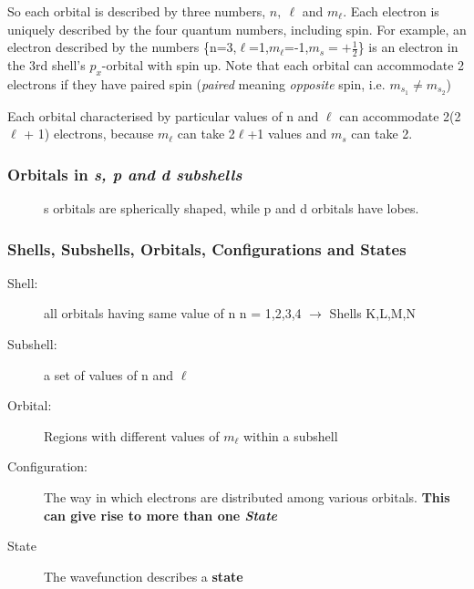 \documentclass[a4paper,titlepage]{article}
\begin{document}
\begin{frame}
So each orbital is described by three numbers, \(n,\ \ell\) and \(m_\ell\).
\bigskip
Each electron is uniquely described by the four quantum numbers, including spin. For example, an electron described by the numbers \{n=3,\(\ell\)=1,\(m_\ell\)=-1,\(m_s = +\frac{1}{2}\)\} is an electron in the 3rd shell's \(p_x\)-orbital with spin up. Note that each orbital can accommodate 2 electrons if they have paired spin (\textit{paired} meaning \textit{opposite} spin, i.e. \(m_{s_1} \ne m_{s_2}\))\par
\bigskip
Each orbital characterised by particular values of n and \(\ell\) can accommodate 2(2\(\ell\) + 1) electrons, because \(m_\ell\) can take 2\(\ell\)+1 values and \(m_s\) can take 2.
\end{frame}

\begin{frame}
\frametitle{Orbitals in \textit{s, p and d subshells}}
\begin{figure}[h!]
\centering
{}
\caption{s orbitals are spherically shaped, while p and d orbitals have lobes.}
\end{figure}
\end{frame}

\begin{frame}
\frametitle{Shells, Subshells, Orbitals, Configurations and States}
\begin{description}
\item[Shell:] all orbitals having same value of n\newline
n = 1,2,3,4 \(\rightarrow\) Shells K,L,M,N
\item[Subshell:] a set of values of n and \(\ell\) 
\item[Orbital:] Regions with different values of \(m_\ell\) within a subshell
\item[Configuration:] The way in which electrons are distributed among various orbitals. \textbf{This can give rise to more than one \textit{State}}
\item[State] The wavefunction describes a \textbf{state}
\end{description}
\end{frame}
\end{document}
